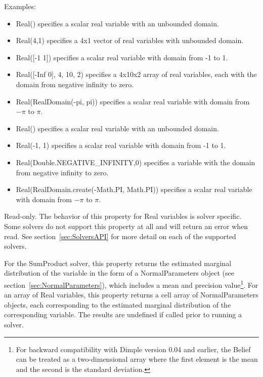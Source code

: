 Examples:

\ifmatlab
\begin{itemize}
\item Real() specifies a scalar real variable with an unbounded domain.
\item Real(4,1) specifies a 4x1 vector of real variables with unbounded domain.
\item Real([-1 1]) specifies a scalar real variable with domain from -1 to 1.
\item Real([-Inf 0], 4, 10, 2) specifies a 4x10x2 array of real variables, each with the domain from negative infinity to zero.
\item Real(RealDomain(-pi, pi)) specifies a scalar real variable with domain from $-\pi$ to $\pi$.
\end{itemize}
\fi

\ifjava
\begin{itemize}
\item Real() specifies a scalar real variable with an unbounded domain.
\item Real(-1, 1) specifies a scalar real variable with domain from -1 to 1.
\item Real(Double.NEGATIVE\_INFINITY,0) specifies a variable with the domain from negative infinity to zero.
\item Real(RealDomain.create(-Math.PI, Math.PI)) specifies a scalar real variable with domain from $-\pi$ to $\pi$.
\end{itemize}
\fi




Read-only.  The behavior of this property for Real variables is solver specific.  Some solvers do not support this property at all and will return an error when read.  See section~\ref{sec:SolversAPI} for more detail on each of the supported solvers.

For the SumProduct solver, this property returns the estimated marginal distribution of the variable in the form of a NormalParameters object (see section~\ref{sec:NormalParameters}), which includes a mean and precision value\ifmatlab\footnote{For backward compatibility with Dimple version 0.04 and earlier, the Belief can be treated as a two-dimensional array where the first element is the mean and the second is the standard deviation.}\fi.  \ifmatlab For an array of Real variables, this property returns a cell array of NormalParameters objects, each corresponding to the estimated marginal distribution of the corresponding variable. \fi The results are undefined if called prior to running a solver.


